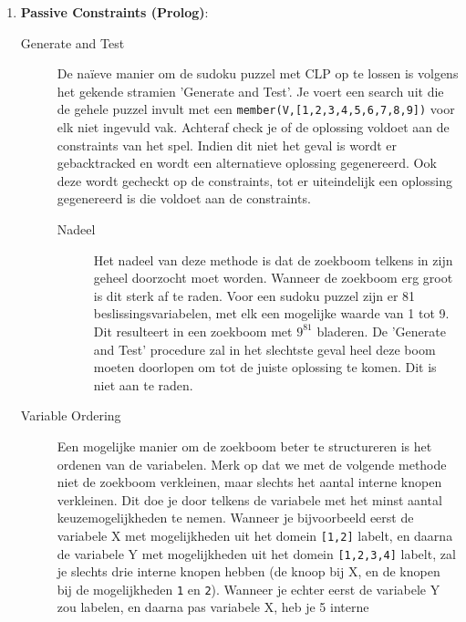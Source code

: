 \begin{enumerate}
 \item \textbf{Passive Constraints (Prolog)}:
        \begin{description}
         \item[Generate and Test]
                De na\"ieve manier om de sudoku puzzel met CLP op te lossen is volgens het 
                gekende stramien 'Generate and Test'. Je voert een search uit die de gehele
                puzzel invult met een \verb|member(V,[1,2,3,4,5,6,7,8,9])| voor elk niet ingevuld
                vak. Achteraf check je of de oplossing voldoet aan de constraints van het spel.
                Indien dit niet het geval is wordt er gebacktracked en wordt een alternatieve
                oplossing gegenereerd. Ook deze wordt gecheckt op de constraints, tot 
                er uiteindelijk een oplossing gegenereerd is die voldoet aan de constraints.
                \begin{description}
                \item[Nadeel] Het nadeel van deze methode is dat de zoekboom telkens 
                        in zijn geheel doorzocht moet worden. Wanneer de zoekboom erg groot
                        is dit sterk af te raden. Voor een sudoku puzzel zijn er 81 beslissingsvariabelen,
                        met elk een mogelijke waarde van 1 tot 9. Dit resulteert
                        in een zoekboom met $9^{81}$ bladeren. De 'Generate and Test' procedure
                        zal in het slechtste geval heel deze boom moeten doorlopen om tot de
                        juiste oplossing te komen. Dit is niet aan te raden.
                \end{description}
        \item[Variable Ordering]
                Een mogelijke manier om de zoekboom beter te structureren is het ordenen van de variabelen.
                Merk op dat we met de volgende methode niet de zoekboom verkleinen, maar slechts het
                aantal interne knopen verkleinen. Dit doe je door telkens de variabele met het minst aantal keuzemogelijkheden te nemen.
                Wanneer je bijvoorbeeld eerst de variabele X met mogelijkheden 
                uit het domein \verb|[1,2]| labelt, en daarna de variabele Y met mogelijkheden uit
                het domein \verb|[1,2,3,4]| labelt, zal je slechts drie interne knopen hebben (de knoop
                bij X, en de knopen bij de mogelijkheden \verb|1| en \verb|2|). Wanneer je echter
                eerst de variabele Y zou labelen, en daarna pas variabele X, heb je 5 interne

\end{description}
\end{enumerate}
